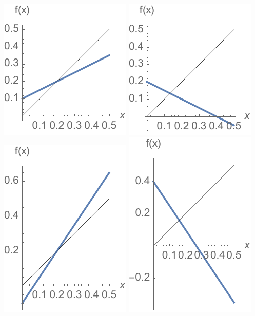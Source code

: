 \documentclass[12pt,letterpaper,noanswers]{exam}
\begin{document}
\includegraphics{img/C04mapsp3a.pdf}
\includegraphics{img/C04mapsp3b.pdf}
\includegraphics{img/C04mapsp3c.pdf}
\includegraphics{img/C04mapsp3d.pdf}
\end{document}

